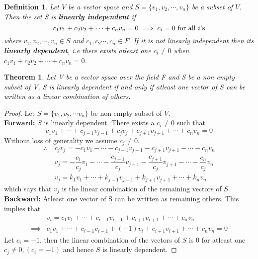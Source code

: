 \documentclass[a4paper, titlepage]{article}
\newtheorem{theorem}{Theorem}[section]
\newtheorem{definition}{Definition}[section]
\begin{document}
    \begin{definition}
        Let $V$ be a vector space and $S = \{ v_1, v_2, \cdots,  v_n \}$ be a subset of $V$. 
        Then the set S is \textbf{linearly independent} if
        \[ 
            c_1v_1 + c_2v_2 + \cdots + c_nv_n = 0 \implies c_i = 0 
            \textup{ for all } i\textup{'s}    
        \]
        where $v_1, v_2, \cdots, v_n \in S$ and $c_1, c_2 \cdots, 
        c_n \in F$. If it is not linearly independent then its 
        \textbf{linearly dependent}, i.e there exists atleast one 
        $c_i \neq 0$ when $c_1v_1 + c_2v_2 + \cdots + c_nv_n = 0$.
    \end{definition}
    \begin{theorem}
        Let V be a vector space over the field F and S be a non
        empty subset of V. S is linearly dependent if and only if
        atleast one vector of $S$ can be written as a linear combination
        of others.
    \end{theorem}
    \begin{proof}
        Let $S = \{ v_1, v_2, \cdots v_n \}$ be non-empty subset of $V$. \hfill \\
        \textbf{Forward: }$S$ is linearly dependent. There exists a $c_i \neq 0$
        such that \[ c_1v_1 + \cdots + c_{j-1}v_{j-1} + c_jv_j + c_{j+1}v_{j+1} + \cdots + c_nv_n = 0 \]
        Without loss of generality we assume $c_j \neq 0$.
        \begin{align*}
            \therefore \; & c_jv_j = - c_1v_1 - \cdots - c_{j-1}v_{j-1} - c_{j+1}v_{j+1} - \cdots - c_nv_n \\
            & v_j = - \dfrac{c_1}{c_j}v_1 - \cdots - \dfrac{c_{j-1}}{c_j}v_{j-1} - \dfrac{c_{j+1}}{c_j}v_{j+1} - \cdots - \dfrac{c_n}{c_j}v_n \\
            & v_j = k_1v_1 + \cdots + k_{j-1}v_{j-1} + k_{j+1}v_{j+1} + \cdots + k_nv_n
    \end{align*}
    which says that $v_j$ is the linear combination of the remaining 
    vectors of $S$. \hfill \\
    \textbf{Backward: }Atleast one vector of S can be written as 
    remaining others. This implies that 
    \begin{align*}
        & v_i = c_1v_1 + \cdots + c_{i-1}v_{i-1} + c_{i+1}v_{i+1} + \cdots + c_nv_n \\
        \implies &c_1v_1 + \cdots + c_{i-1}v_{i-1} + (-1)v_i + c_{i+1}v_{i+1} + \cdots + c_nv_n = 0
    \end{align*}
    Let $c_i = -1$, then the linear combination of the vectors of $S$
    is 0 for atleast one $c_j \neq 0, (c_i = -1)$ and hence $S$ is linearly dependent.
    \end{proof}
\end{document}
